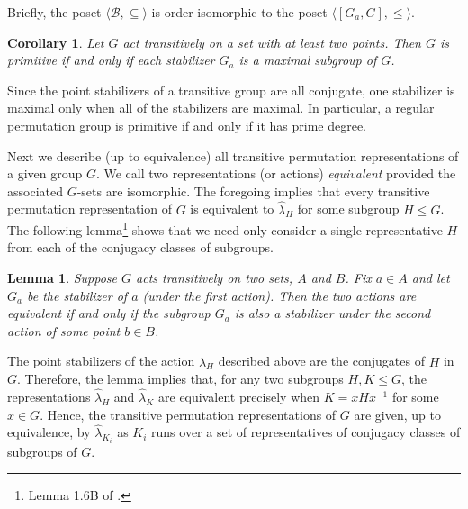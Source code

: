 \documentclass[cm,dissertation,actual,final]{uhthesis}
\theoremstyle{plain}
\newtheorem{corollary}[theorem]{Corollary}
\newtheorem{lemma}[theorem]{Lemma}
\theoremstyle{definition}
\theoremstyle{remark}
\numberwithin{theorem}{section}
\numberwithin{claim}{chapter}
\numberwithin{equation}{section}
\numberwithin{conjecture}{chapter}
\newcommand{\<}{\ensuremath{\langle}}
\renewcommand{\>}{\ensuremath{\rangle}}
\renewcommand{\leq}{\ensuremath{\leqslant}}
\newcommand{\0}{\ensuremath{\mathbf{0}}}
\newcommand{\1}{\ensuremath{\mathbf{1}}}
\newcommand{\2}{\ensuremath{\mathbf{2}}}
\newcommand{\3}{\ensuremath{\mathbf{3}}}
\newcommand{\4}{\ensuremath{\mathbf{4}}}
\newcommand{\5}{\ensuremath{\mathbf{5}}}
\newcommand{\sB}{\ensuremath{\mathscr{B}}}
\newcommand{\hlambda}{\ensuremath{\hat{\lambda}}}
\newcommand{\stab}[1]{\ensuremath{G_{#1}}}
\begin{document}
  Briefly, the poset $\<\sB, \subseteq\>$ is order-isomorphic to the 
  poset $\<[\stab{a},G], \leq\>$. 

  \begin{corollary}
    Let $G$ act transitively on a set with at least two
    points. 
    Then $G$ is primitive if and only if each stabilizer $\stab{a}$ is a
    maximal subgroup of $G$.
  \end{corollary}

  Since the point stabilizers of a transitive group are all conjugate, 
  one stabilizer is maximal only when all of the stabilizers are maximal. 
  In particular, a regular permutation group is primitive if and only if it has
  prime degree. 

Next we describe (up to equivalence) all transitive permutation
representations of a given group $G$.  
We call two representations (or actions) 
%
\emph{equivalent}
provided the associated $G$-sets are isomorphic. 
The foregoing implies that every transitive permutation representation of $G$ is
equivalent to $\hlambda_H$ for some subgroup $H \leq G$.  The following
lemma\footnote{Lemma 1.6B of \cite{Dixon:1996}.} 
shows that we need only consider a single representative $H$ from each of the
conjugacy classes of subgroups.  

\begin{lemma}
  Suppose $G$ acts transitively on two sets,
  $A$ and $B$.  Fix $a\in A$ and let $G_a$ be the stabilizer of $a$ (under the first
  action).  Then the two actions are equivalent
  if and only if the subgroup $G_a$ is also a stabilizer under the second action
  of some point $b\in B$. 
\end{lemma}

The point stabilizers of the action $\hlambda_H$ described above are the
conjugates of $H$ in $G$.  Therefore, the lemma implies that, for any two
subgroups $H, K \leq G$, the representations $\hlambda_H$ and $\hlambda_K$ are
equivalent precisely when $K = x Hx^{-1}$ for some $x\in G$. 
Hence, the transitive permutation representations of $G$ are given, up to
equivalence, by $\hlambda_{K_i}$ as $K_i$ runs over a set of representatives of
conjugacy classes of subgroups of $G$.   
\end{document}
